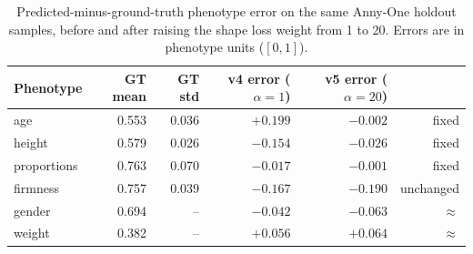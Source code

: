 
\begin{table}[h]
\centering\small
\begin{tabular}{lrrrrr}
\toprule
Phenotype & GT mean & GT std & v4 error ($\alpha{=}1$) & v5 error ($\alpha{=}20$) & \\
\midrule
age          & 0.553 & 0.036 & $+0.199$ & $\mathbf{-0.002}$ & fixed \\
height       & 0.579 & 0.026 & $-0.154$ & $\mathbf{-0.026}$ & fixed \\
proportions  & 0.763 & 0.070 & $-0.017$ & $\mathbf{-0.001}$ & fixed \\
firmness     & 0.757 & 0.039 & $-0.167$ & $-0.190$ & unchanged \\
gender       & 0.694 & --    & $-0.042$ & $-0.063$ & $\approx$ \\
weight       & 0.382 & --    & $+0.056$ & $+0.064$ & $\approx$ \\
\bottomrule
\end{tabular}
\caption{Predicted-minus-ground-truth phenotype error on the same Anny-One
holdout samples, before and after raising the shape loss weight from 1 to 20.
Errors are in phenotype units ($[0,1]$).}
\label{tab:shape}
\end{table}

